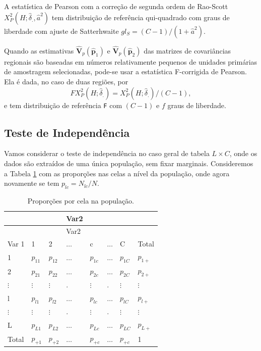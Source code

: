 \documentclass[]{book}
\theoremstyle{definition}
\theoremstyle{definition}
\theoremstyle{definition}
\theoremstyle{remark}
\begin{document}
A estatística de Pearson com a correção de segunda ordem de Rao-Scott
\(X_{P}^{2}\left( H;\hat{\delta}_{.},\hat{a}^{2}\right)\) tem
distribuição de referência qui-quadrado com graus de liberdade com
ajuste de Satterhwaite
\(gl_{S}=\left( C-1\right) /\left( 1+\hat{a} ^{2}\right)\).

Quando as estimativas
\(\mathbf{\hat{V}}_{p}\left( \widehat{\mathbf{p}} _{1}\right)\) e
\(\mathbf{\hat{V}}_{p}\left( \widehat{\mathbf{p}}_{2}\right)\) das
matrizes de covariâncias regionais são baseadas em números relativamente
pequenos de unidades primárias de amostragem selecionadas, pode-se usar
a estatística F-corrigida de Pearson. Ela é dada, no caso de duas
regiões, por \[
FX_{P}^{2}\left( H;\hat{\delta}_{.}\right) =X_{P}^{2}\left( H;\hat{\delta}
_{.}\right) /\left( C-1\right),
\] e tem distribuição de referência \texttt{F} com \(\left(C-1\right)\)
e \(f\) graus de liberdade.

\subsection{Teste de Independência}\label{teste-de-independencia-1}

Vamos considerar o teste de independência no caso geral de tabela
\(L\times C\), onde os dados são extraídos de uma única população, sem
fixar marginais. Consideremos a Tabela \ref{tab:tab83} com as proporções
nas celas a nível da população, onde agora novamente se tem
\(p_{lc}=N_{lc}/N\).

\begin{longtable}[]{@{}llllllll@{}}
\caption{\label{tab:tab83} Proporções por cela na população.}\tabularnewline
\toprule
& & & Var2 & & & &\tabularnewline
\midrule
\endfirsthead
\toprule
& & & Var2 & & & &\tabularnewline
\midrule
\endhead
Var 1 & 1 & 2 & \(\ldots\) & c & \(\ldots\) & C & Total\tabularnewline
1 & \(p_{11}\) & \(p_{12}\) & \(\ldots\) & \(p_{1c}\) & \(\ldots\) &
\(p_{1C}\) & \(p_{1+}\)\tabularnewline
2 & \(p_{21}\) & \(p_{22}\) & \(\ldots\) & \(p_{2c}\) & \(\ldots\) &
\(p_{2C}\) & \(p_{2+}\)\tabularnewline
\(\vdots\) & \(\vdots\) & \(\vdots\) & . & \(\vdots\) & . & \(\vdots\) &
\(\vdots\)\tabularnewline
l & \(p_{l1}\) & \(p_{l2}\) & \(\ldots\) & \(p_{lc}\) & \(\ldots\) &
\(p_{lC}\) & \(p_{l+}\)\tabularnewline
\(\vdots\) & \(\vdots\) & \(\vdots\) & . & \(\vdots\) & . & \(\vdots\) &
\(\vdots\)\tabularnewline
L & \(p_{L1}\) & \(p_{L2}\) & \(\ldots\) & \(p_{Lc}\) & \(\ldots\) &
\(p_{LC}\) & \(p_{L+}\)\tabularnewline
Total & \(p_{+1}\) & \(p_{+2}\) & \(\ldots\) & \(p_{+c}\) & \(\ldots\) &
\(p_{+c}\) & 1\tabularnewline
\bottomrule
\end{longtable}
\end{document}
